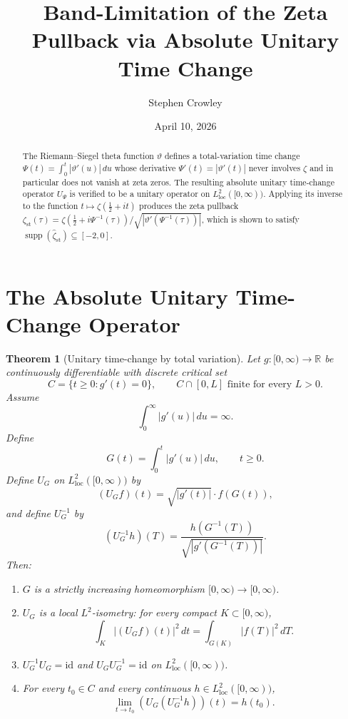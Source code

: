 \documentclass[11pt]{article}
\title{Band-Limitation of the Zeta Pullback via Absolute Unitary Time Change}
\author{Stephen Crowley}
\date{April 10, 2026}
\newtheorem{theorem}{Theorem}
\theoremstyle{definition}
\begin{document}
\maketitle

\begin{abstract}
The Riemann--Siegel theta function $\vartheta$ defines a total-variation
time change $\Psi(t)=\int_0^t|\vartheta'(u)|\,du$ whose derivative
$\Psi'(t)=|\vartheta'(t)|$ never involves $\zeta$ and in particular
does not vanish at zeta zeros.  The resulting absolute unitary
time-change operator $U_\Psi$ is verified to be a unitary operator on
$L^2_{\mathrm{loc}}([0,\infty))$.  Applying its inverse to the function
$t\mapsto\zeta(\tfrac12+it)$ produces the zeta pullback
$\zeta_{\mathrm{st}}(\tau)=\zeta(\tfrac12+i\Psi^{-1}(\tau))/
\sqrt{|\vartheta'(\Psi^{-1}(\tau))|}$,
which is shown to satisfy
$\operatorname{supp}(\hat\zeta_{\mathrm{st}})\subseteq[-2,0]$.
\end{abstract}

\tableofcontents

\section{The Absolute Unitary Time-Change Operator}

\begin{theorem}[Unitary time-change by total variation]
\label{thm:UTC}
Let $g:[0,\infty)\to\mathbb{R}$ be continuously differentiable with
discrete critical set
\[
C = \{t\ge 0 : g'(t)=0\},\qquad C\cap[0,L]\text{ finite for every }L>0.
\]
Assume
\[
\int_0^\infty|g'(u)|\,du=\infty.
\]
Define
\[
G(t)=\int_0^t|g'(u)|\,du,\qquad t\ge 0.
\]
Define $U_G$ on $L^2_{\mathrm{loc}}([0,\infty))$ by
\begin{equation}\label{eq:UG}
(U_G f)(t)=\sqrt{|g'(t)|}\cdot f(G(t)),
\end{equation}
and define $U_G^{-1}$ by
\begin{equation}\label{eq:UGinv}
(U_G^{-1}h)(T)=\frac{h(G^{-1}(T))}{\sqrt{|g'(G^{-1}(T))|}}.
\end{equation}
Then:
\begin{enumerate}
\item[\textup{(1)}] $G$ is a strictly increasing homeomorphism
  $[0,\infty)\to[0,\infty)$.
\item[\textup{(2)}] $U_G$ is a local $L^2$-isometry: for every compact
  $K\subset[0,\infty)$,
  \[
  \int_K|(U_G f)(t)|^2\,dt=\int_{G(K)}|f(T)|^2\,dT.
  \]
\item[\textup{(3)}] $U_G^{-1}U_G=\mathrm{id}$ and
  $U_GU_G^{-1}=\mathrm{id}$ on $L^2_{\mathrm{loc}}([0,\infty))$.
\item[\textup{(4)}] For every $t_0\in C$ and every continuous
  $h\in L^2_{\mathrm{loc}}([0,\infty))$,
  \[
  \lim_{t\to t_0}(U_G(U_G^{-1}h))(t)=h(t_0).
  \]
\end{enumerate}
\end{theorem}
\end{document}
